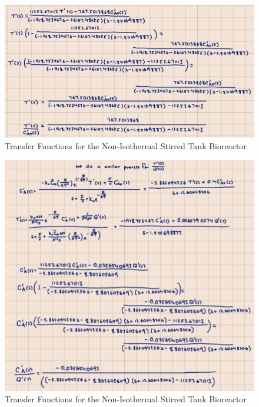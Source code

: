 \documentclass[12pt]{article}
\begin{document}
\begin{enumerate}
\begin{enumerate}
    \begin{figure}[H]
      \centering
      \includegraphics[width=\textwidth]{Figures/handcalc/figure4-4c.png}
      \caption{Transfer Functions for the Non-Isothermal Stirred Tank Bioreactor}
      \label{fig:figure47}
    \end{figure}

    \begin{figure}[H]
      \centering
      \includegraphics[width=\textwidth]{Figures/handcalc/figure4-4d.png}
      \caption{Transfer Functions for the Non-Isothermal Stirred Tank Bioreactor}
      \label{fig:figure48}
    \end{figure}





  \end{enumerate}

\end{enumerate}
\end{document}
